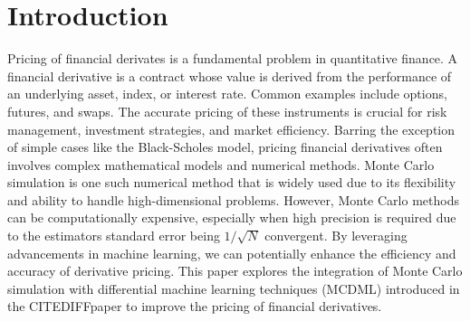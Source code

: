 \section{Introduction}

Pricing of financial derivates is a fundamental problem in quantitative finance. A financial derivative is a contract whose value is derived from the performance of an underlying asset, index, or interest rate. Common examples include options, futures, and swaps. The accurate pricing of these instruments is crucial for risk management, investment strategies, and market efficiency. Barring the exception of simple cases like the Black-Scholes model, pricing financial derivatives often involves complex mathematical models and numerical methods. Monte Carlo simulation is one such numerical method that is widely used due to its flexibility and ability to handle high-dimensional problems. However, Monte Carlo methods can be computationally expensive, especially when high precision is required due to the estimators standard error being $1/\sqrt{N}$ convergent. By leveraging advancements in machine learning, we can potentially enhance the efficiency and accuracy of derivative pricing. This paper explores the integration of Monte Carlo simulation with differential machine learning techniques (MCDML) introduced in the CITEDIFFpaper to improve the pricing of financial derivatives. 